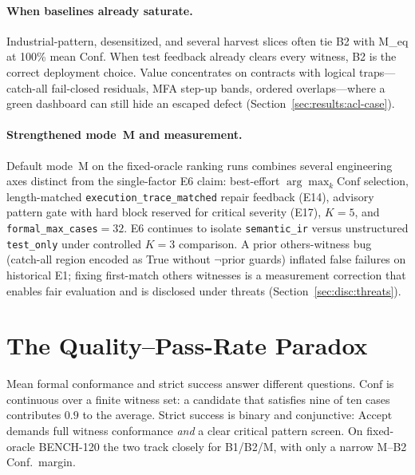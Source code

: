 \paragraph{When baselines already saturate.}
Industrial-pattern, desensitized, and several harvest slices often tie B2 with
M\_eq at 100\% mean Conf.
When test feedback already clears every witness, B2 is the correct deployment
choice.
Value concentrates on contracts with logical traps---catch-all fail-closed
residuals, MFA step-up bands, ordered overlaps---where a green dashboard can
still hide an escaped defect (Section~\ref{sec:results:acl-case}).

\paragraph{Strengthened mode~M and measurement.}
Default mode~M on the fixed-oracle ranking runs combines several engineering
axes distinct from the single-factor E6 claim: best-effort
$\arg\max_k\mathrm{Conf}$ selection, length-matched
\texttt{execution\_trace\_matched} repair feedback (E14), advisory pattern
gate with hard block reserved for critical severity (E17), $K{=}5$, and
\texttt{formal\_max\_cases}${=}32$.
E6 continues to isolate \texttt{semantic\_ir} versus unstructured
\texttt{test\_only} under controlled $K{=}3$ comparison.
A prior others-witness bug (catch-all region encoded as True without
$\neg$prior guards) inflated false failures on historical E1; fixing
first-match others witnesses is a measurement correction that enables fair
evaluation and is disclosed under threats
(Section~\ref{sec:disc:threats}).


\section{The Quality--Pass-Rate Paradox}
\label{sec:disc:paradox}

Mean formal conformance and strict success answer different questions.
$\mathrm{Conf}$ is continuous over a finite witness set: a candidate that
satisfies nine of ten cases contributes $0.9$ to the average.
Strict success is binary and conjunctive: $\mathrm{Accept}$ demands full
witness conformance \emph{and} a clear critical pattern screen.
On fixed-oracle BENCH-120 the two track closely for B1/B2/M, with only a
narrow M--B2 Conf.\ margin.

